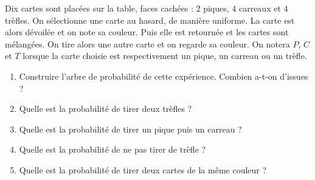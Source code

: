 \documentclass[11pt,fleqn, openany]{book} %
\begin{document}
\begin{exercise}[topic=prob11]Dix cartes sont placées sur la table, faces cachées : 2 piques, 4 carreaux et 4 trèfles. On sélectionne une carte au hasard, de manière uniforme. La carte est alors dévoilée et on note sa couleur. Puis elle est retournée et les cartes sont mélangées. On tire alors une autre carte et on regarde sa couleur. On notera $P$, $C$ et $T$ lorsque la carte choisie est respectivement un pique, un carreau ou un trèfle.
\begin{enumerate}
\item Construire l'arbre de probabilité de cette expérience. Combien a-t-on d'issues ?
\item Quelle est la probabilité de tirer deux trèfles ?
\item Quelle est la probabilité de tirer un pique puis un carreau ?
\item Quelle est la probabilité de ne pas tirer de trèfle ?
\item Quelle est la probabilité de tirer deux cartes de la même couleur ?
\end{enumerate}\end{exercise}
\end{document}
